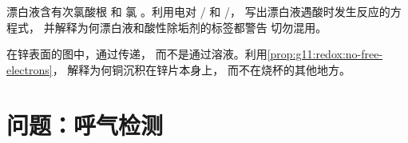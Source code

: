 \begin{exercise}[$\star\star\star$]\label{exo:g11:redox:14}
漂白液含有次氯酸根  和
氯 。利用电对 / 和 /，
写出漂白液遇酸时发生反应的方程式，
并解释为何漂白液和酸性除垢剂的标签都警告
切勿混用。
\end{exercise}

\begin{exercise}[$\star\star\star$]\label{exo:g11:redox:15}
在锌表面的图中，通过传递，
而不是通过溶液。利用\cref{prop:g11:redox:no-free-electrons}，
解释为何铜沉积在锌片本身上，
而不在烧杯的其他地方。
\end{exercise}

\section{问题：呼气检测}

